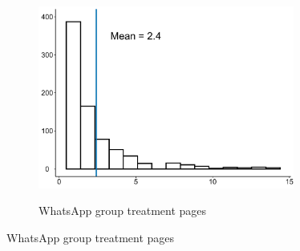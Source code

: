 \documentclass[12pt]{article}
\begin{document}
\begin{figure}[H]
\begin{subfigure}[b]{0.48\linewidth}
    \label{} 
  \end{subfigure}
  \hspace{\fill}
  \begin{subfigure}[b]{0.48\linewidth}
    \centering    
    \caption{WhatsApp group treatment pages} 
    \includegraphics[height=6cm,width=8cm\linewidth]{Figures/Other/pages_wg.pdf} 
    \label{figure:video_visits}
  \end{subfigure} 
  \label{}
\end{figure}
\end{document}
